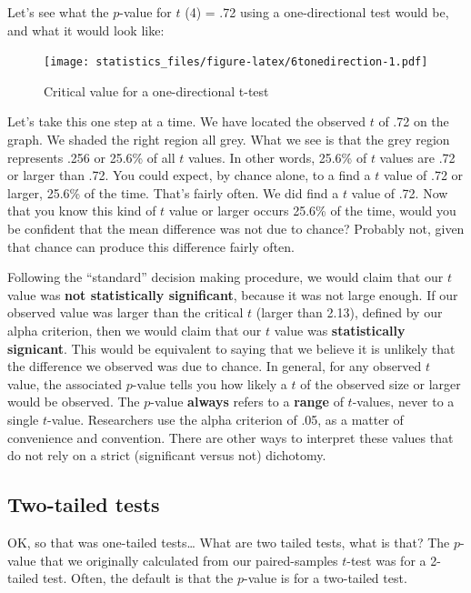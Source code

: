 \documentclass[]{book}
\begin{document}
Let's see what the \(p\)-value for \(t\) (4) = .72 using a one-directional test would be, and what it would look like:

\begin{figure}
\centering
\texttt{[image: statistics\_files/figure-latex/6tonedirection-1.pdf]}
\caption{\label{fig:6tonedirection}Critical value for a one-directional t-test}
\end{figure}

Let's take this one step at a time. We have located the observed \(t\) of .72 on the graph. We shaded the right region all grey. What we see is that the grey region represents .256 or 25.6\% of all \(t\) values. In other words, 25.6\% of \(t\) values are .72 or larger than .72. You could expect, by chance alone, to a find a \(t\) value of .72 or larger, 25.6\% of the time. That's fairly often. We did find a \(t\) value of .72. Now that you know this kind of \(t\) value or larger occurs 25.6\% of the time, would you be confident that the mean difference was not due to chance? Probably not, given that chance can produce this difference fairly often.

Following the ``standard'' decision making procedure, we would claim that our \(t\) value was \textbf{not statistically significant}, because it was not large enough. If our observed value was larger than the critical \(t\) (larger than 2.13), defined by our alpha criterion, then we would claim that our \(t\) value was \textbf{statistically signicant}. This would be equivalent to saying that we believe it is unlikely that the difference we observed was due to chance. In general, for any observed \(t\) value, the associated \(p\)-value tells you how likely a \(t\) of the observed size or larger would be observed. The \(p\)-value \textbf{always} refers to a \textbf{range} of \(t\)-values, never to a single \(t\)-value. Researchers use the alpha criterion of .05, as a matter of convenience and convention. There are other ways to interpret these values that do not rely on a strict (significant versus not) dichotomy.

\hypertarget{two-tailed-tests}{%
\subsection{Two-tailed tests}\label{two-tailed-tests}}

OK, so that was one-tailed tests\ldots{} What are two tailed tests, what is that? The \(p\)-value that we originally calculated from our paired-samples \(t\)-test was for a 2-tailed test. Often, the default is that the \(p\)-value is for a two-tailed test.
\end{document}
